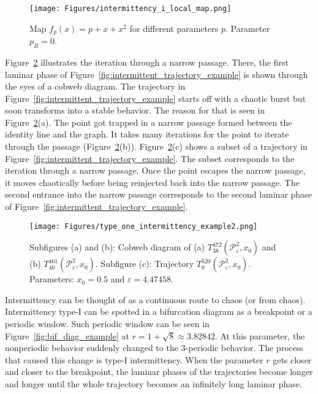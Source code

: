\begin{figure}[!h]
    \centering
    \texttt{[image: Figures/intermittency\_i\_local\_map.png]}
    \caption{
        Map $f_{p}(x) = p + x + x^2$ for different parameters $p$. 
        Parameter $p_B = 0$.
    }
    \label{fig:saddle_node_bifurcation}
\end{figure}

\par
Figure~\ref{fig:intermittent_cobweb_example} illustrates the iteration through a narrow passage.
There, the first laminar phase of Figure~\ref{fig:intermittent_trajectory_example} is shown through the eyes of a cobweb diagram.
The trajectory in Figure~\ref{fig:intermittent_trajectory_example} starts off with a chaotic burst but soon transforms into a stable behavior.
The reason for that is seen in Figure~\ref{fig:intermittent_cobweb_example}(a). The point got trapped in a narrow passage formed between the identity line and the graph.
It takes many iterations for the point to iterate through the passage (Figure~\ref{fig:intermittent_cobweb_example}(b)).
Figure~\ref{fig:intermittent_cobweb_example}(c) shows a subset of a trajectory in Figure~\ref{fig:intermittent_trajectory_example}.
The subset corresponds to the iteration through a narrow passage.
Once the point escapes the narrow passage, it moves chaotically before being reinjected back into the narrow passage.
The second entrance into the narrow passage corresponds to the second laminar phase of Figure~\ref{fig:intermittent_trajectory_example}.

\begin{figure}[!h]
    \centering
    \texttt{[image: Figures/type\_one\_intermittency\_example2.png]}
    \caption{
        Subfigures (a) and (b):
        Cobweb diagram of 
        (a) $T^{472}_{38}(\mathcal{P}_{\varepsilon}^{2}, x_0)$ and
        (b) $T^{461}_{40}(\mathcal{P}_{\varepsilon}^{2}, x_0)$. 
        Subfigure (c):
        Trajectory $T^{520}_{0}(\mathcal{P}_{\varepsilon}^{2}, x_0)$.
        Parameters: $x_0 = 0.5$ and $\varepsilon = 4.47458$.
    }
    \label{fig:intermittent_cobweb_example}
\end{figure}

\par
Intermittency can be thought of as a continuous route to chaos (or from chaos).
Intermittency type-I can be spotted in a bifurcation diagram as a breakpoint or a periodic window.
Such periodic window can be seen in Figure~\ref{fig:bif_diag_example} at $r = 1+\sqrt{8} \approx 3.82842$.
At this parameter, the nonperiodic behavior suddenly changed to the $3$-periodic behavior.
The process that caused this change is type-I intermittency.
When the parameter $r$ gets closer and closer to the breakpoint, the laminar phases of the trajectories become longer and longer until the whole trajectory becomes an infinitely long laminar phase.


